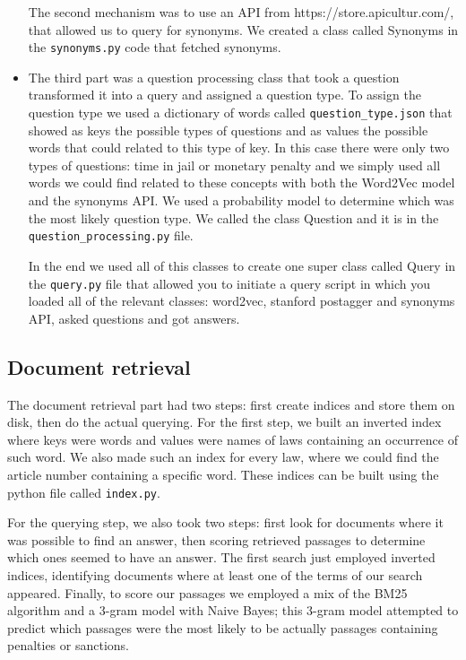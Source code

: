\documentclass[letterpaper, margin=1in]{article}
\begin{document}
\begin{itemize}
The second mechanism was to use an API from https://store.apicultur.com/, 
that allowed us to query for synonyms. We created a class called Synonyms in the \texttt{synonyms.py} code that fetched synonyms. 

\item The third part was a question processing class that took a question transformed it into a query and assigned a question type. To assign the question type we used a dictionary of words
called \texttt{question_type.json} that showed as keys the possible types of questions 
and as values the possible words that could related to this type of key. In this case there
were only two types of questions: time in jail or monetary penalty and we simply used all words we could find related to these concepts with both the Word2Vec model and the synonyms API. We used a probability model to determine which was the most likely question type. We called the class Question and it is in the \texttt{question_processing.py} file.


In the end we used all of this classes to create one super class called Query in the \texttt{query.py} file that allowed you to initiate a query script in which you loaded all of the relevant classes: word2vec, stanford postagger and synonyms API, asked questions and got answers. 

\end{itemize} 

\subsection{Document retrieval}
The document retrieval part had two steps: first create indices and store them on disk, then do the actual querying. For the first step, we built an inverted index where keys were words and values were names of laws containing an occurrence of such word. We also made such an index for every law, where we could find the article number containing a specific word.  These indices can be built using the python file called \texttt{index.py}. 

For the querying step, we also took two steps: first look for documents where it was possible to find an answer, then scoring retrieved passages to determine which ones seemed to have an answer. The first search just employed inverted indices, identifying documents where at least one of the terms of our search appeared. Finally, to score our passages we employed a mix of the BM25 algorithm and a 3-gram model with Naive Bayes; this 3-gram model attempted to predict which passages were the most likely to be actually passages containing penalties or sanctions.
\end{document}
